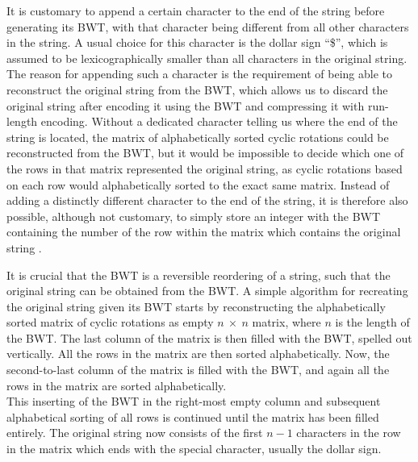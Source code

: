 \documentclass[a4paper,12pt,twoside,BCOR=10mm]{scrbook}
\begin{document}
It is customary to append a certain character to the end of the string before generating its BWT,
with that character being different from all other characters in the string.
A usual choice for this character is the dollar sign “\$”,
which is assumed to be lexicographically smaller than all characters in the original string. \\
The reason for appending such a character is the requirement of being able to reconstruct the original string
from the BWT, which allows us to discard the original string after encoding it using the BWT
and compressing it with run-length encoding.
Without a dedicated character telling us where the end of the string is located,
the matrix of alphabetically sorted cyclic rotations could be reconstructed from the BWT,
but it would be impossible to decide which one of the rows in that matrix represented the original
string, as cyclic rotations based on each row would alphabetically sorted to the exact same matrix.
Instead of adding a distinctly different character to the end of the string,
it is therefore also possible, although not customary, to simply store an integer with the BWT containing
the number of the row within the matrix which contains the original string \citep{Nelson1996}.

It is crucial that the BWT is a reversible reordering of a string,
such that the original string can be obtained from the BWT.
A simple algorithm for recreating the original string given its BWT starts by reconstructing the alphabetically sorted
matrix of cyclic rotations as empty $ n {\: \times \:} n $ matrix, where $ n $ is the length of the BWT.
The last column of the matrix is then filled with the BWT, spelled out vertically.
All the rows in the matrix are then sorted alphabetically.
Now, the second-to-last column of the matrix is filled with the BWT,
and again all the rows in the matrix are sorted alphabetically. \\
This inserting of the BWT in the right-most empty column and subsequent alphabetical sorting of all rows
is continued until the matrix has been filled entirely.
The original string now consists of the first $ n - 1 $ characters in the row in the matrix which
ends with the special character,
usually the dollar sign.

\end{document}
